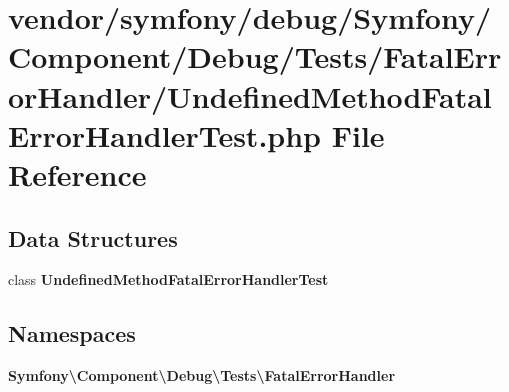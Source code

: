 \section{vendor/symfony/debug/\+Symfony/\+Component/\+Debug/\+Tests/\+Fatal\+Error\+Handler/\+Undefined\+Method\+Fatal\+Error\+Handler\+Test.php File Reference}
\label{_undefined_method_fatal_error_handler_test_8php}
\subsection*{Data Structures}
\begin{DoxyCompactItemize}
\item 
class {\bf Undefined\+Method\+Fatal\+Error\+Handler\+Test}
\end{DoxyCompactItemize}
\subsection*{Namespaces}
\begin{DoxyCompactItemize}
\item 
 {\bf Symfony\textbackslash{}\+Component\textbackslash{}\+Debug\textbackslash{}\+Tests\textbackslash{}\+Fatal\+Error\+Handler}
\end{DoxyCompactItemize}
